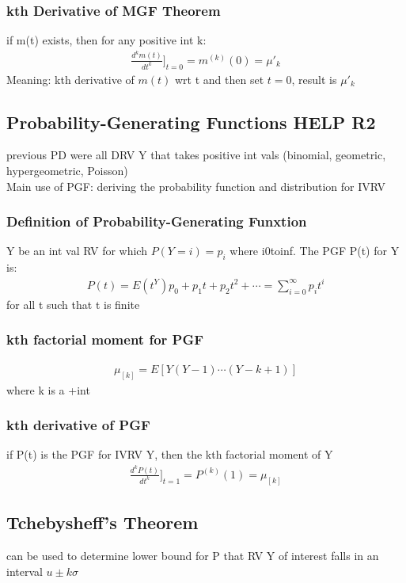 \documentclass[12pt]{article}
\begin{document}
    \subsubsection{kth Derivative of MGF Theorem}
        if m(t) exists, then for any positive int k:
        \begin{align*}
            \frac{d^{k}m(t)}{dt^{k}}\big]_{t=0} = m^{(k)}(0) = \mu'_{k}
        \end{align*}
        Meaning: kth derivative of $ m(t) $ wrt t and then set $ t=0 $,
        result is $ \mu'_{k} $
\subsection{Probability-Generating Functions HELP R2}
    previous PD were all DRV Y that takes positive int vals
    (binomial, geometric, hypergeometric, Poisson)\\
    Main use of PGF: deriving the probability function and distribution
    for IVRV
    \subsubsection{Definition of Probability-Generating Funxtion}
        Y be an int val RV for which $ P(Y = i) = p_{i}$ where i0toinf.
        The PGF P(t) for Y is:
        \begin{align*}
            P(t) = E(t^{Y}) p_{0} + p_{1}t + p_{2}t^2 + \cdots
            = \sum_{i=0}^{\infty}p_{i}t^{i}
        \end{align*} 
        for all t such that t is finite
    \subsubsection{kth factorial moment for PGF}
        \begin{align*}
            \mu _{[k]} = E[Y(Y-1)\cdots(Y-k+1)]
        \end{align*}
        where k is a +int
    \subsubsection{kth derivative of PGF}
        if P(t) is the PGF for IVRV Y, then the kth factorial moment of Y
        \begin{align*}
        \frac{d^{k}P(t)}{dt^{k}} \big]_{t=1}= P^{(k)}(1) = \mu _{[k]}
        \end{align*}
\subsection{Tchebysheff's Theorem}
    can be used to determine lower bound for P that RV Y of interest
    falls in an interval $ u \pm k\sigma  $
\end{document}

